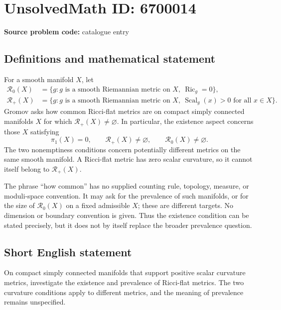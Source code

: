\documentclass[11pt]{article}
\begin{document}
\section*{UnsolvedMath ID: 6700014}
\textbf{Source problem code:} catalogue entry
\subsection{Definitions and mathematical statement}
For a smooth manifold \(X\), let
\[
\begin{split}
\mathcal R_0(X)&=\{g:g\text{ is a smooth Riemannian metric on }X,\ \operatorname{Ric}_g=0\},\\
\mathcal R_+(X)&=\{g:g\text{ is a smooth Riemannian metric on }X,\ \operatorname{Scal}_g(x)>0\text{ for all }x\in X\}.
\end{split}
\]
Gromov asks how common Ricci-flat metrics are on compact simply connected manifolds \(X\) for which \(\mathcal R_+(X)\ne\varnothing\). In particular, the existence aspect concerns those \(X\) satisfying
\[
\pi_1(X)=0,\qquad \mathcal R_+(X)\ne\varnothing,\qquad \mathcal R_0(X)\ne\varnothing.
\]
The two nonemptiness conditions concern potentially different metrics on the same smooth manifold. A Ricci-flat metric has zero scalar curvature, so it cannot itself belong to \(\mathcal R_+(X)\).

The phrase ``how common'' has no supplied counting rule, topology, measure, or moduli-space convention. It may ask for the prevalence of such manifolds, or for the size of \(\mathcal R_0(X)\) on a fixed admissible \(X\); these are different targets. No dimension or boundary convention is given. Thus the existence condition can be stated precisely, but it does not by itself replace the broader prevalence question.
\subsection{Short English statement}
On compact simply connected manifolds that support positive scalar curvature metrics, investigate the existence and prevalence of Ricci-flat metrics. The two curvature conditions apply to different metrics, and the meaning of prevalence remains unspecified.
\end{document}
